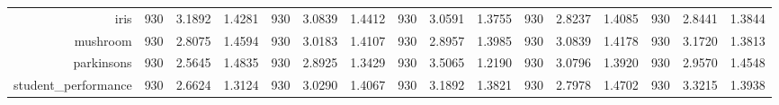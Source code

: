 \begin{table}[htbp]
{\begin{tabular}{rccccccccccccccc}
                  iris                                & 930                                 & 3.1892                                                                    & 1.4281          & 930                                & 3.0839                                                                             & 1.4412          & 930                                & 3.0591                                                                    & 1.3755          & 930                                & \cellcolor[rgb]{ .776,  .937,  .808}\textcolor[rgb]{ 0,  .38,  0}{2.8237} & 1.4085          & 930                                    & 2.8441                                                                    & 1.3844          \\
                  mushroom                            & 930                                 & \cellcolor[rgb]{ .776,  .937,  .808}\textcolor[rgb]{ 0,  .38,  0}{2.8075} & 1.4594          & 930                                & 3.0183                                                                             & 1.4107          & 930                                & 2.8957                                                                    & 1.3985          & 930                                & 3.0839                                                                    & 1.4178          & 930                                    & 3.1720                                                                    & 1.3813          \\
                  parkinsons                          & 930                                 & \cellcolor[rgb]{ .776,  .937,  .808}\textcolor[rgb]{ 0,  .38,  0}{2.5645} & 1.4835          & 930                                & 2.8925                                                                             & 1.3429          & 930                                & 3.5065                                                                    & 1.2190          & 930                                & 3.0796                                                                    & 1.3920          & 930                                    & 2.9570                                                                    & 1.4548          \\
                  student\_performance                & 930                                 & \cellcolor[rgb]{ .776,  .937,  .808}\textcolor[rgb]{ 0,  .38,  0}{2.6624} & 1.3124          & 930                                & 3.0290                                                                             & 1.4067          & 930                                & 3.1892                                                                    & 1.3821          & 930                                & 2.7978                                                                    & 1.4702          & 930                                    & 3.3215                                                                    & 1.3938          \\

\end{tabular}}
\end{table}
